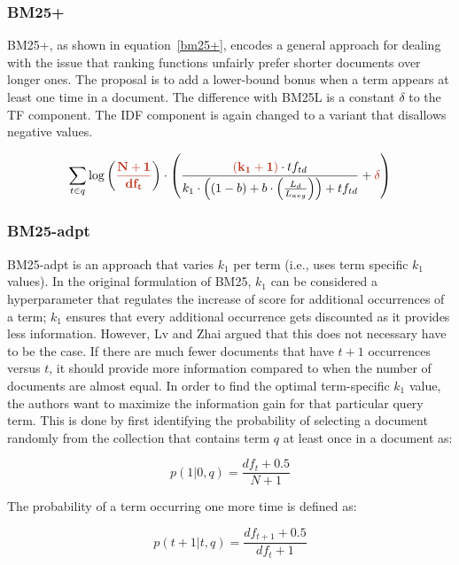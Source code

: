 \subsubsection{BM25+~\cite{bm25+}}
BM25+, as shown in equation~\ref{bm25+}, encodes a general approach for dealing with the issue that ranking functions unfairly prefer shorter documents over longer ones. The proposal is to add a lower-bound bonus when a term appears at least one time in a document. The difference with BM25L is a constant $\delta$ to the TF component. The IDF component is again changed to a variant that disallows negative values.

\begin{equation}
	\label{bm25+}
	\sum_{t\in q} \log\left(\mathbf{\begingroup\color{ruhuisstijlrood}\frac{N+1}{df_t}\endgroup}\right)\cdot\left(\frac{\mathbf{\begingroup\color{ruhuisstijlrood}\left(k_1 + 1\right)\endgroup}\cdot tf_{td}}{k_1\cdot\left(\left(1-b\right)+b\cdot\left(\frac{L_d}{L_{avg}}\right)\right)+tf_{td}}+\mathbf{\begingroup\color{ruhuisstijlrood}\delta\endgroup}\right)
\end{equation}

\subsubsection{BM25-adpt~\cite{bm25-adpt}}
BM25-adpt is an approach that varies $k_1$ per term (i.e., uses term specific $k_1$ values). In the original formulation of BM25, $k_1$ can be considered a hyperparameter that regulates the increase of score for additional occurrences of a term; $k_1$ ensures that every additional occurrence gets discounted as it provides less information. However, Lv and Zhai argued that this does not necessary have to be the case. If there are much fewer documents that have $t+1$ occurrences versus $t$, it should provide more information compared to when the number of documents are almost equal. In order to find the optimal term-specific $k_1$ value, the authors want to maximize the information gain for that particular query term. 
This is done by first identifying the probability of selecting a document randomly from the collection that contains term $q$ at least once in a document as:

\begin{equation}
	p(1|0,q) = \frac{df_t+0.5}{N+1}
\end{equation}

The probability of a term occurring one more time is defined as:

\begin{equation}
p(t+1|t,q) = \frac{df_{t+1}+0.5}{df_t+1}
\end{equation}

